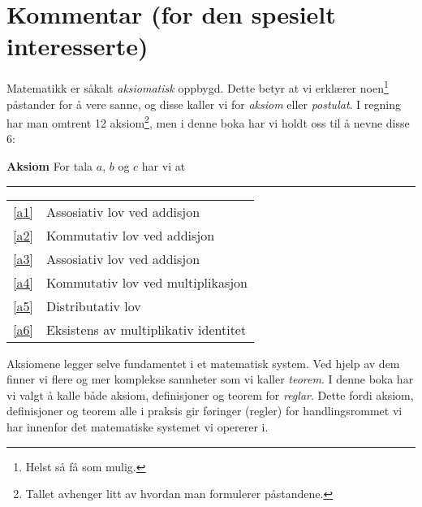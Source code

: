 



	
\section*{Kommentar (for den spesielt interesserte) \label{Kommentar1}}
Matematikk er såkalt \textit{aksiomatisk} oppbygd. Dette betyr at vi erklærer noen\footnote{Helst så få som mulig.} påstander for å vere sanne, og disse kaller vi for \textit{aksiom} eller \textit{postulat}. I regning har man omtrent 12 aksiom\footnote{Tallet avhenger litt av hvordan man formulerer påstandene.}, men i denne boka har vi holdt oss til å nevne disse 6:
\regv 

\begin{tcolorbox}[boxrule=0.3 mm,arc=0mm,colback=blue!5] {\large \textbf{Aksiom} \vspace{5 pt}}\newline
For tala $ a $, $ b $ og $ c $ har vi at
\rule{1\linewidth}{0.75bp}
\begin{center}
	\begin{tabular}{rl}
		\eqref{a1} &Assosiativ lov ved addisjon\\
		\eqref{a2} & Kommutativ lov ved addisjon \\	
		\eqref{a3} & Assosiativ lov ved addisjon \\
		\eqref{a4} & Kommutativ lov ved multiplikasjon \\		
		\eqref{a5} & Distributativ lov\\	
		\eqref{a6} & Eksistens av multiplikativ identitet
	\end{tabular}
\end{center}
\end{tcolorbox}
\vsk
Aksiomene legger selve fundamentet i et matematisk system. Ved hjelp av dem finner vi flere og mer komplekse sannheter som vi kaller \textit{teorem}. I denne boka har vi valgt å kalle både aksiom, definisjoner og teorem for \textsl{reglar}. Dette fordi aksiom, definisjoner og teorem alle i praksis gir føringer (regler) for handlingsrommet vi har innenfor det matematiske systemet vi opererer i.\vsk
